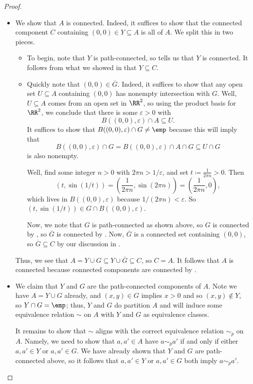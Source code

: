 \documentclass[../notes.tex]{subfiles}
\begin{document}
\begin{proof}
\begin{itemize}
		\item We show that $A$ is connected. Indeed, it suffices to show that the connected component $C$ containing $(0,0)\in Y\subseteq A$ is all of $A$. We split this in two pieces.
		\begin{itemize}
			\item To begin, note that $Y$ is path-connected, so  tells us that $Y$ is connected. It follows from what we showed in  that $Y\subseteq C$.
			\item Quickly {note that $(0,0)\in\overline G$}. Indeed, it suffices to show that any open set $U\subseteq A$ containing $(0,0)$ has nonempty intersection with $G$. Well, $U\subseteq A$ comes from an open set in $\RR^2$, so using the product basis for $\RR^2$, we conclude that there is some $\varepsilon>0$ with
			\[B((0,0),\varepsilon)\cap A\subseteq U.\]
			It suffices to show that $B((0,0),\varepsilon)\cap G\ne\emp$ because this will imply that
			\[B((0,0),\varepsilon)\cap G=B((0,0),\varepsilon)\cap A\cap G\subseteq U\cap G\]
			is also nonempty.

			Well, find some integer $n>0$ with $2\pi n>1/\varepsilon$, and set $t\coloneqq\frac1{2\pi n}>0$. Then
			\[(t,\sin(1/t))=\left(\frac1{2\pi n},\sin(2\pi n)\right)=\left(\frac1{2\pi n},0\right),\]
			which lives in $B((0,0),\varepsilon)$ because $1/(2\pi n)<\varepsilon$. So $(t,\sin(1/t))\in G\cap B((0,0),\varepsilon)$.

			Now, we note that $G$ is path-connected as shown above, so $G$ is connected by , so $\overline G$ is connected by . Now, $\overline G$ is a connected set containing $(0,0)$, so $\overline G\subseteq C$ by our discussion in .
		\end{itemize}
		Thus, we see that $A=Y\cup G\subseteq Y\cup\overline G\subseteq C$, so $C=A$. It follows that $A$ is connected because connected components are connected by .
		\item We claim that {$Y$ and $G$ are the path-connected components of $A$}. Note we have $A=Y\cup G$ already, and $(x,y)\in G$ implies $x>0$ and so $(x,y)\notin Y$, so $Y\cap G=\emp$; thus, $Y$ and $G$ do partition $A$ and will induce some equivalence relation $\sim$ on $A$ with $Y$ and $G$ as equivalence classes.

		It remains to show that $\sim$ aligns with the correct equivalence relation $\sim_p$ on $A$. Namely, we need to show that $a,a'\in A$ have $a\sim_pa'$ if and only if either $a,a'\in Y$ or $a,a'\in G$. We have already shown that $Y$ and $G$ are path-connected above, so it follows that $a,a'\in Y$ or $a,a'\in G$ both imply $a\sim_pa'$.


\end{itemize}
\end{proof}
\end{document}
